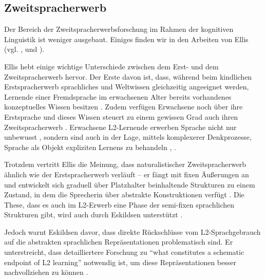 
\subsection{Zweitspracherwerb}
Der Bereich der Zweitspracherwerbsforschung im Rahmen der kognitiven Linguistik ist weniger ausgebaut.
Einiges finden wir in den Arbeiten von Ellis (vgl. \cite{Ellis04}, \cite{Ellis06} und \cite{Ellis08}).

Ellis hebt einige wichtige Unterschiede zwischen dem Erst- und dem Zweitspracherwerb hervor.
Der Erste davon ist, dass, während beim kindlichen Erstspracherwerb sprachliches und Weltwissen gleichzeitig angeeignet werden, Lernende einer Fremdsprache im erwachsenen Alter bereits vorhandenes konzeptuelles Wissen besitzen \cite[S.72]{Ellis08}.
Zudem verfügen Erwachsene noch über ihre Erstsprache und dieses Wissen steuert zu einem gewissen Grad auch ihren Zweitspracherwerb \cite[S.72]{Ellis08}.
Erwachsene L2-Lernende erwerben Sprache nicht nur unbewusst \cite[``implizit'', vgl.][S.63 ff.]{Ellis04}, sondern sind auch in der Lage, mittels komplexerer Denkprozesse, Sprache als Objekt expliziten Lernens zu behandeln \cite[S.72]{Ellis08}, \cite[S.65]{Ellis04}.

Trotzdem vertritt Ellis die Meinung, dass naturalistischer Zweitspracherwerb ähnlich wie der Erstspracherwerb verläuft --
er fängt mit fixen Äußerungen an und entwickelt sich graduell über Platzhalter beinhaltende Strukturen zu einem Zustand, in dem die Sprecherin über abstrakte Konstruktionen verfügt \cite[vgl.][S.74]{Ellis08}.
Die These, dass es auch im L2-Erwerb eine Phase der semi-fixen sprachlichen Strukturen gibt, wird auch durch Eskildsen unterstützt \cite[S.338]{Eskildsen08}.

Jedoch warnt Eskildsen davor, dass direkte Rückschlüsse vom L2-Sprachgebrauch auf die abstrakten sprachlichen Repräsentationen problematisch sind.
Er unterstreicht, dass detailliertere Forschung zu ``what constitutes a schematic endpoint of L2 learning'' notwendig ist, um diese Repräsentationen besser nachvollziehen zu können \cite[S.353]{Eskildsen08}.


